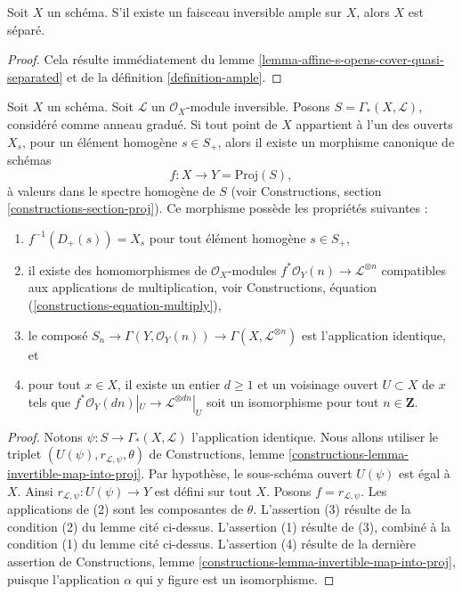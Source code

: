 \begin{lemma}
\label{lemma-ample-separated}
Soit $X$ un schéma. S'il existe un faisceau inversible ample sur $X$,
alors $X$ est séparé.
\end{lemma}

\begin{proof}
Cela résulte immédiatement du
lemme \ref{lemma-affine-s-opens-cover-quasi-separated} et
de la définition \ref{definition-ample}.
\end{proof}

\begin{lemma}
\label{lemma-map-into-proj}
Soit $X$ un schéma.
Soit $\mathcal{L}$ un $\mathcal{O}_X$-module inversible.
Posons $S = \Gamma_*(X, \mathcal{L})$, considéré comme anneau
gradué. Si tout point de $X$ appartient à l'un
des ouverts $X_s$, pour un élément homogène $s \in S_{+}$, alors il
existe un morphisme canonique de schémas
$$
f : X \longrightarrow Y = \text{Proj}(S),
$$
à valeurs dans le spectre homogène de $S$ (voir
Constructions, section \ref{constructions-section-proj}).
Ce morphisme possède les propriétés suivantes :
\begin{enumerate}
\item $f^{-1}(D_{+}(s)) = X_s$ pour tout élément homogène $s \in S_{+}$,
\item il existe des homomorphismes de $\mathcal{O}_X$-modules
$f^*\mathcal{O}_Y(n) \to \mathcal{L}^{\otimes n}$
compatibles aux applications de multiplication,
voir Constructions, équation (\ref{constructions-equation-multiply}),
\item le composé
$S_n \to \Gamma(Y, \mathcal{O}_Y(n)) \to \Gamma(X, \mathcal{L}^{\otimes n})$
est l'application identique, et
\item pour tout $x \in X$, il existe un entier $d \geq 1$
et un voisinage ouvert $U \subset X$ de $x$
tels que $f^*\mathcal{O}_Y(dn)|_U \to \mathcal{L}^{\otimes dn}|_U$
soit un isomorphisme pour tout $n \in \mathbf{Z}$.
\end{enumerate}
\end{lemma}

\begin{proof}
Notons $\psi : S \to \Gamma_*(X, \mathcal{L})$ l'application
identique. Nous allons utiliser le triplet
$(U(\psi), r_{\mathcal{L}, \psi}, \theta)$ de
Constructions, lemme \ref{constructions-lemma-invertible-map-into-proj}.
Par hypothèse, le sous-schéma ouvert $U(\psi)$ est égal à $X$. Ainsi
$r_{\mathcal{L}, \psi} : U(\psi) \to Y$ est défini sur tout $X$.
Posons $f = r_{\mathcal{L}, \psi}$.
Les applications de (2) sont les composantes de $\theta$.
L'assertion (3) résulte de la condition (2) du lemme cité
ci-dessus. L'assertion (1) résulte de (3), combiné à la condition (1) du lemme
cité ci-dessus. L'assertion (4) résulte de la dernière assertion
de Constructions, lemme \ref{constructions-lemma-invertible-map-into-proj},
puisque l'application $\alpha$ qui y figure est un isomorphisme.
\end{proof}

